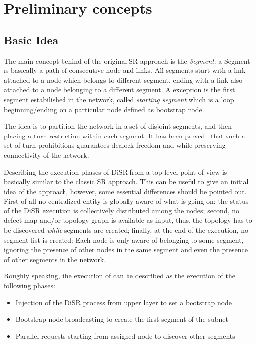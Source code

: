 
\section{Preliminary concepts}
\label{sec:disr_concepts}

\subsection{Basic Idea}
The main concept behind of the original SR approach is the
\emph{Segment}: a Segment is basically a path of consecutive node
and links. All segments start with a link attached to a node which
belongs to different segment, ending with a link also attached to a
node belonging to a different segment. A exception is the first
segment estabilished in the network, called \emph{starting segment} which is  a loop
beginning/ending on a particular node defined as bootstrap node.

The idea is to partition the network in a set of disjoint segments, and then
placing a turn restriction within each segment. It has been proved~\cite{mejia_ipdps06}
that such a set of turn prohibitions guarantees dealock freedom and
while preserving connectivity of the network.

Describing the execution phases of DiSR from a top level point-of-view
is basically similar to the classic SR approach. This can be useful to
give an initial idea of the approach, however, some essential
differences should be pointed out. First of all no centralized entity is
globally aware of what is going on: the status of the DiSR execution
is collectively distributed among the nodes; second, no defect map and/or
topology graph is available as input, thus, the topology has to be
discovered \emph{while} segments are created; finally, at the end of the
execution, no segment list is created: Each node is only aware of
belonging to some segment, ignoring the presence of other nodes
in the same segment and even the presence of other segments in the
network.

Roughly speaking, the execution of can be described as the execution
of the following phases:
\begin{itemize}
\item Injection of the DiSR process from upper layer to set a bootstrap
node
\item Bootstrap node broadcasting to create the first segment of the subnet
\item Parallel requests starting from assigned node to discover other segments
\end{itemize}

